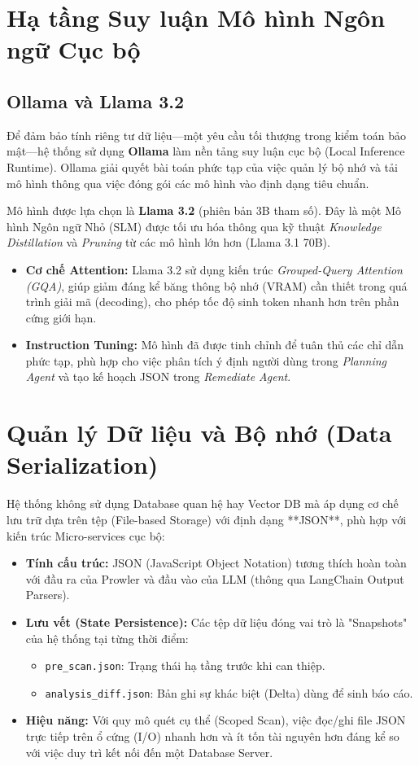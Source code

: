\section{Hạ tầng Suy luận Mô hình Ngôn ngữ Cục bộ}

\subsection{Ollama và Llama 3.2}
Để đảm bảo tính riêng tư dữ liệu—một yêu cầu tối thượng trong kiểm toán bảo mật—hệ thống sử dụng \textbf{Ollama} làm nền tảng suy luận cục bộ (Local Inference Runtime). Ollama giải quyết bài toán phức tạp của việc quản lý bộ nhớ và tải mô hình thông qua việc đóng gói các mô hình vào định dạng tiêu chuẩn.

Mô hình được lựa chọn là \textbf{Llama 3.2} (phiên bản 3B tham số). Đây là một Mô hình Ngôn ngữ Nhỏ (SLM) được tối ưu hóa thông qua kỹ thuật \textit{Knowledge Distillation} và \textit{Pruning} từ các mô hình lớn hơn (Llama 3.1 70B). 
\begin{itemize}
    \item \textbf{Cơ chế Attention:} Llama 3.2 sử dụng kiến trúc \textit{Grouped-Query Attention (GQA)}, giúp giảm đáng kể băng thông bộ nhớ (VRAM) cần thiết trong quá trình giải mã (decoding), cho phép tốc độ sinh token nhanh hơn trên phần cứng giới hạn.
    \item \textbf{Instruction Tuning:} Mô hình đã được tinh chỉnh để tuân thủ các chỉ dẫn phức tạp, phù hợp cho việc phân tích ý định người dùng trong \textit{Planning Agent} và tạo kế hoạch JSON trong \textit{Remediate Agent}.
\end{itemize}

\section{Quản lý Dữ liệu và Bộ nhớ (Data Serialization)}
Hệ thống không sử dụng Database quan hệ hay Vector DB mà áp dụng cơ chế lưu trữ dựa trên tệp (File-based Storage) với định dạng **JSON**, phù hợp với kiến trúc Micro-services cục bộ:

\begin{itemize}
    \item \textbf{Tính cấu trúc:} JSON (JavaScript Object Notation) tương thích hoàn toàn với đầu ra của Prowler và đầu vào của LLM (thông qua LangChain Output Parsers).
    \item \textbf{Lưu vết (State Persistence):} Các tệp dữ liệu đóng vai trò là "Snapshots" của hệ thống tại từng thời điểm:
    \begin{itemize}
        \item \texttt{pre\_scan.json}: Trạng thái hạ tầng trước khi can thiệp.
        \item \texttt{analysis\_diff.json}: Bản ghi sự khác biệt (Delta) dùng để sinh báo cáo.
    \end{itemize}
    \item \textbf{Hiệu năng:} Với quy mô quét cụ thể (Scoped Scan), việc đọc/ghi file JSON trực tiếp trên ổ cứng (I/O) nhanh hơn và ít tốn tài nguyên hơn đáng kể so với việc duy trì kết nối đến một Database Server.
\end{itemize}

